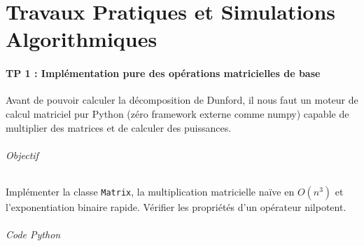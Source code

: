 \documentclass[11pt,a4paper]{article}
\begin{document}
\vspace{1cm}
\newpage
\part{Travaux Pratiques et Simulations Algorithmiques}
\subsection*{TP 1 : Implémentation pure des opérations matricielles de base}

Avant de pouvoir calculer la décomposition de Dunford, il nous faut un moteur de calcul matriciel pur Python (zéro framework externe comme numpy) capable de multiplier des matrices et de calculer des puissances.

\paragraph*{Objectif}
Implémenter la classe \texttt{Matrix}, la multiplication matricielle naïve en $O(n^3)$ et l'exponentiation binaire rapide. Vérifier les propriétés d'un opérateur nilpotent.

\paragraph*{Code Python}
\end{document}

